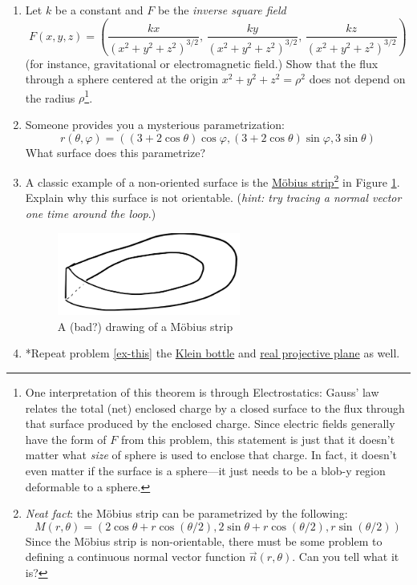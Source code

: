 \documentclass[12pt]{article}
\numberwithin{equation}{subsection}
\numberwithin{figure}{subsection}
\theoremstyle{note}
\begin{document}
{\begin{enumerate}[label=\arabic*.]
\item Let $k$ be a constant and $F$ be the \textit{inverse square field} \[ F(x,y,z)=\left( \dfrac{kx}{(x^2+y^2+z^2)^{3/2}}, \,\dfrac{ky}{(x^2+y^2+z^2)^{3/2}} , \,\dfrac{kz}{(x^2+y^2+z^2)^{3/2}} \right) \] (for instance, gravitational or electromagnetic field.) Show that the flux through a sphere centered at the origin $x^2+y^2+z^2=\rho^2$ does not depend on the radius $\rho$\footnote{One interpretation of this theorem is through Electrostatics: Gauss' law relates the total (net) enclosed charge by a closed surface to the flux through that surface produced by the enclosed charge. Since electric fields generally have the form of $F$ from this problem, this statement is just that it doesn't matter what \textit{size} of sphere is used to enclose that charge. In fact, it doesn't even matter if the surface is a sphere---it just needs to be a blob-y region deformable to a sphere.}. 

\item Someone provides you a mysterious parametrization: \[ r(\theta, \varphi)=\left( (3+2\cos\theta)\cos \varphi, (3+2\cos\theta) \sin \varphi, 3\sin \theta\right)\] What surface does this parametrize? 

\item \label{ex-this} A classic example of a non-oriented surface is the \href{https://en.wikipedia.org/wiki/M\%C3\%B6bius_strip}{M\"obius strip}\footnote{ \textit{Neat fact}: the M\"obius strip can be parametrized by the following:
\[ M(r,\theta)= \left( 2\cos \theta+r \cos(\theta/2), 2\sin\theta+r \cos(\theta/2), r\sin(\theta/2) \right) \] Since the M\"obius strip is non-orientable, there must be some problem to defining a continuous normal vector function $\vec{n}(r,\theta)$. Can you tell what it is?}
in Figure \ref{fig-Mob}. Explain why this surface is not orientable. (\textit{hint: try tracing a normal vector one time around the loop}.) 
\begin{figure}[h!]
\centering  \includegraphics[width=60mm]{Images/mobius}
\caption{A (bad?) drawing of a M\"obius strip}
\label{fig-Mob} 
\end{figure}

\item \label{NO-surfaces} *Repeat problem \ref{ex-this} the \href{https://en.wikipedia.org/wiki/Klein_bottle}{Klein bottle} and \href{https://en.wikipedia.org/wiki/Real_projective_plane}{real projective plane} as well. 


\end{enumerate}}
\end{document}
